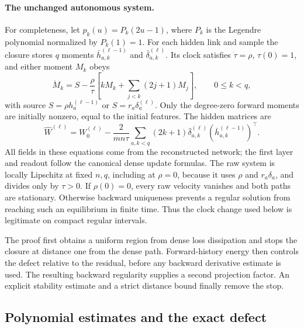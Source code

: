 \paragraph{The unchanged autonomous system.}
For completeness, let $p_k(u)=P_k(2u-1)$, where $P_k$ is the Legendre
polynomial normalized by $P_k(1)=1$.  For each hidden link and sample the
closure stores $q$ moments $\bar h_{a,k}^{(\ell-1)}$ and
$\bar\delta_{a,k}^{(\ell)}$.  Its clock satisfies $\dot\tau=\rho$,
$\tau(0)=1$, and either moment $M_k$ obeys
\begin{equation}
 \dot M_k=S-\frac{\rho}{\tau}
   \left[kM_k+\sum_{j<k}(2j+1)M_j\right],\qquad 0\le k<q,
 \label{eq:ft-moments}
\end{equation}
with source $S=\rho h_a^{(\ell-1)}$ or $S=r_a\delta_a^{(\ell)}$.
Only the degree-zero forward moments are initially nonzero, equal to
the initial features.  The hidden matrices are
\begin{equation}
 \widehat W^{(\ell)}=W_0^{(\ell)}-
 \frac{2}{mn\tau}\sum_{a,k<q}(2k+1)
      \bar\delta_{a,k}^{(\ell)}
      (\bar h_{a,k}^{(\ell-1)})^\top.
 \label{eq:ft-reconstruction}
\end{equation}
All fields in these equations come from the reconstructed network;
the first layer and readout follow the canonical dense update formulas.
The raw system is locally Lipschitz at fixed $n,q$, including at
$\rho=0$, because it uses $\rho$ and $r_a\delta_a$, and divides only
by $\tau>0$.  If $\rho(0)=0$, every raw velocity vanishes and both
paths are stationary.  Otherwise backward uniqueness prevents a regular
solution from reaching such an equilibrium in finite time.  Thus the
clock change used below is legitimate on compact regular intervals.

The proof first obtains a uniform region from dense loss dissipation and
stops the closure at distance one from the dense path.  Forward-history
energy then controls the defect relative to the residual, before any
backward derivative estimate is used.  The resulting backward regularity
supplies a second projection factor.  An explicit stability estimate and
a strict distance bound finally remove the stop.

\subsection*{Polynomial estimates and the exact defect}

